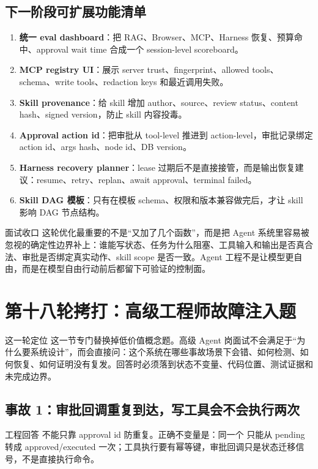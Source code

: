 \subsection{下一阶段可扩展功能清单}
\begin{enumerate}[leftmargin=2em]
  \item \textbf{统一 eval dashboard}：把 RAG、Browser、MCP、Harness 恢复、预算命中、approval wait time 合成一个 session-level scoreboard。
  \item \textbf{MCP registry UI}：展示 server trust、fingerprint、allowed tools、schema、write tools、redaction keys 和最近调用失败。
  \item \textbf{Skill provenance}：给 skill 增加 author、source、review status、content hash、signed version，防止 skill 内容投毒。
  \item \textbf{Approval action id}：把审批从 tool-level 推进到 action-level，审批记录绑定 action id、args hash、node id、DB version。
  \item \textbf{Harness recovery planner}：lease 过期后不是直接接管，而是输出恢复建议：resume、retry、replan、await approval、terminal failed。
  \item \textbf{Skill DAG 模板}：只有在模板 schema、权限和版本兼容做完后，才让 skill 影响 DAG 节点结构。
\end{enumerate}

\begin{qaBox}{面试收口}
这轮优化最重要的不是“又加了几个函数”，而是把 Agent 系统里容易被忽视的确定性边界补上：谁能写状态、任务为什么阻塞、工具输入和输出是否真合法、审批是否绑定真实动作、skill scope 是否一致。Agent 工程不是让模型更自由，而是在模型自由行动前后都留下可验证的控制面。
\end{qaBox}

\section{第十八轮拷打：高级工程师故障注入题}

\begin{summaryBox}{这一轮定位}
这一节专门替换掉低价值概念题。高级 Agent 岗面试不会满足于“为什么要系统设计”，而会直接问：这个系统在哪些事故场景下会错、如何检测、如何恢复、如何证明没有复发。回答时必须落到状态不变量、代码位置、测试证据和未完成边界。
\end{summaryBox}

\subsection{事故 1：审批回调重复到达，写工具会不会执行两次}
\begin{qaBox}{工程回答}
不能只靠 approval id 防重复。正确不变量是：同一个  只能从 pending 转成 approved/executed 一次；工具执行要有幂等键，审批回调只是状态迁移信号，不是直接执行命令。
\end{qaBox}


